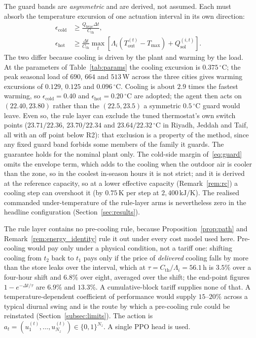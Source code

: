 \documentclass[pdflatex,sn-mathphys-num,iicol]{sn-jnl}
\theoremstyle{thmstyleone}\newtheorem{proposition}{Proposition}\newtheorem{corollary}{Corollary}
\theoremstyle{thmstyletwo}\newtheorem{remark}{Remark}\newtheorem{observation}{Observation}
\theoremstyle{thmstylethree}\newtheorem{definition}{Definition}
\newcommand{\Tmax}{T_{\max}}
\newcommand{\Tout}{T_{\mathrm{out}}}
\newcommand{\Cth}{C_{\mathrm{th}}}
\newcommand{\Qhvac}{Q_{\mathrm{hvac}}}
\begin{document}
The guard bands are \emph{asymmetric} and are derived, not assumed. Each must absorb the temperature excursion of one actuation interval in its own direction:
\begin{equation}
\begin{aligned}
  \epsilon_{\mathrm{cold}}&\ge\frac{\Qhvac\Delta t}{\Cth},\\
  \epsilon_{\mathrm{hot}}&\ge\frac{\Delta t}{\Cth}\max_t\!\left[\Lambda_i(\Tout^{(t)}{-}\Tmax)+Q_{\mathrm{sol}}^{(i,t)}\right].
\end{aligned}
  \label{eq:guard}
\end{equation}
The two differ because cooling is driven by the plant and warming by the load. At the parameters of Table~\ref{tab:params} the cooling excursion is $0.375\,^\circ$C; the peak seasonal load of $690$, $664$ and $513\,$W across the three cities gives warming excursions of $0.129$, $0.125$ and $0.096\,^\circ$C. Cooling is about $2.9$ times the fastest warming, so $\epsilon_{\mathrm{cold}}=0.40$ and $\epsilon_{\mathrm{hot}}=0.20\,^\circ$C are adopted; the agent then acts on $(22.40,23.80)$ rather than the $(22.5,23.5)$ a symmetric $0.5\,^\circ$C guard would leave. Even so, the rule layer can exclude the tuned thermostat's own switch points ($23.71/22.36$, $23.70/22.34$ and $23.64/22.32\,^\circ$C in Riyadh, Jeddah and Taif, all with an off point below R2): that exclusion is a property of the method, since any fixed guard band forbids some members of the family it guards. The guarantee holds for the nominal plant only. The cold-side margin of~\eqref{eq:guard} omits the envelope term, which adds to the cooling when the outdoor air is cooler than the zone, so in the coolest in-season hours it is not strict; and it is derived at the reference capacity, so at a lower effective capacity (Remark~\ref{rem:rc}) a cooling step can overshoot it (by $0.75\,$K per step at $2{,}400\,\text{kJ/K}$). The realised commanded under-temperature of the rule-layer arms is nevertheless zero in the headline configuration (Section~\ref{sec:results}).

The rule layer contains no pre-cooling rule, because Proposition~\ref{prop:path} and Remark~\ref{rem:energy_identity} rule it out under every cost model used here. Pre-cooling would pay only under a physical condition, not a tariff one: shifting cooling from $t_2$ back to $t_1$ pays only if the price of \emph{delivered} cooling falls by more than the store leaks over the interval, which at $\tau=\Cth/\Lambda_i=56.1\,$h is $3.5\%$ over a four-hour shift and $6.8\%$ over eight, averaged over the shift; the end-point figures $1-e^{-\Delta t/\tau}$ are $6.9\%$ and $13.3\%$. A cumulative-block tariff supplies none of that. A temperature-dependent coefficient of performance would supply $15$--$20\%$ across a typical diurnal swing and is the route by which a pre-cooling rule could be reinstated (Section~\ref{subsec:limits}). The action is $a_t=(u_1^{(t)},\ldots,u_{N_z}^{(t)})\in\{0,1\}^{N_z}$. A single PPO head is used.
 
\end{document}
